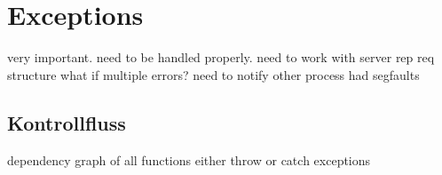 



\section{Exceptions}
\label{sec:exceptions}

very important.
need to be handled properly.
need to work with server rep req structure
what if multiple errors?
need to notify other process
had segfaults



\subsection{Kontrollfluss}

dependency graph of all functions
either throw or catch exceptions


